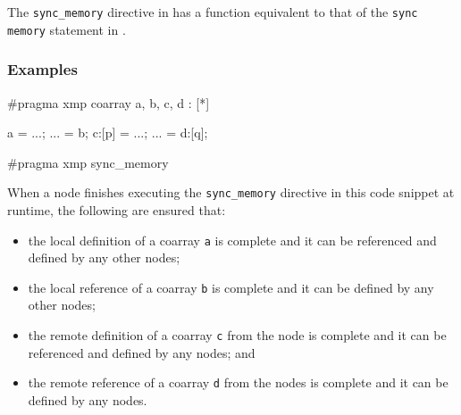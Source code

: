 The {\tt sync\_memory} directive in {\XMPC} has a function equivalent
to that of the {\tt sync memory} statement in {\XMPF}.

\subsubsection*{Examples}

\begin{XCexample}
#pragma xmp coarray a, b, c, d : [*]

a = ...;
... = b;
c:[p] = ...;
... = d:[q];

#pragma xmp sync_memory
\end{XCexample}

\vspace{0.5cm}

When a node finishes executing the {\tt sync\_memory} directive in this
code snippet at runtime, the following are ensured that:

\begin{itemize}
 \item the local definition of a coarray {\tt a} is complete
       and it can be referenced and defined by any other nodes;
 \item the local reference of a coarray {\tt b} is complete
       and it can be defined by any other nodes;
 \item the remote definition of a coarray {\tt c} from the node is
       complete and it can be referenced and defined by any nodes;
       and
 \item the remote reference of a coarray {\tt d} from the nodes is
       complete and it can be defined by any nodes.
\end{itemize}

%


